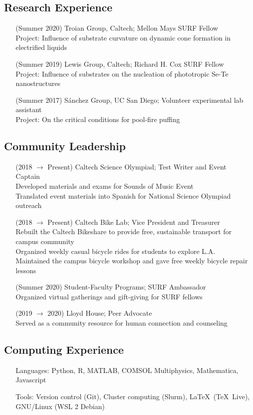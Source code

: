 \documentclass{article}
\begin{document}
\nocite{*}
\printbibliography[title={Publications}, heading=subbibliography]


\subsection*{Research Experience}

\begin{enumerate}
    \item [(Summer 2020)] Troian Group, Caltech; Mellon Mays SURF Fellow \\
        Project: Influence of substrate curvature on dynamic cone formation in electrified liquids
    \item [(Summer 2019)] Lewis Group, Caltech; Richard H. Cox SURF Fellow \\
        Project: Influence of substrates on the nucleation of phototropic Se-Te nanostructures
    \item [(Summer 2017)] Sánchez Group, UC San Diego; Volunteer experimental lab assistant \\
        Project: On the critical conditions for pool-fire puffing
\end{enumerate}


\subsection*{Community Leadership}

\begin{enumerate}
    \item [(2018 $\to$ Present)] Caltech Science Olympiad; Test Writer and Event Captain \\
        Developed materials and exams for Sounds of Music Event \\
        Translated event materials into Spanish for National Science Olympiad outreach
    \item [(2018 $\to$ Present)] Caltech Bike Lab; Vice President and Treasurer \\
        Rebuilt the Caltech Bikeshare to provide free, sustainable transport for campus community \\
        Organized weekly casual bicycle rides for students to explore L.A. \\
        Maintained the campus bicycle workshop and gave free weekly bicycle repair lessons
    \item [(Summer 2020)] Student-Faculty Programs; SURF Ambassador \\
        Organized virtual gatherings and gift-giving for SURF fellows
    \item [(2019 $\to$ 2020)] Lloyd House; Peer Advocate \\
        Served as a community resource for human connection and counseling
\end{enumerate}


\subsection*{Computing Experience}

\begin{enumerate}
	\item [Languages:] Python, R, MATLAB, COMSOL Multiphysics, Mathematica, Javascript
	\item [Tools:] Version control (Git), Cluster computing (Slurm), \LaTeX\ (\TeX\ Live), GNU/Linux (WSL 2 Debian)
\end{enumerate}
\end{document}

